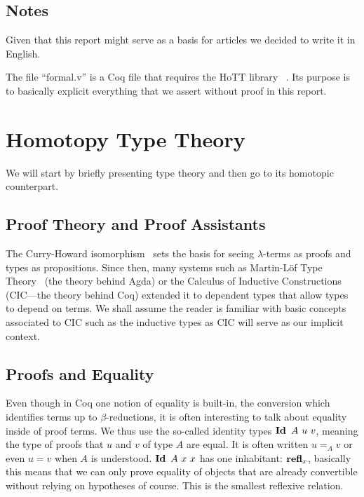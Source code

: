 \documentclass[11pt]{article}
\theoremstyle{plain}
\theoremstyle{remark}
\begin{document}
\subsection*{Notes}

Given that this report might serve as a basis for articles we decided to write
it in English.

The file ``formal.v'' is a Coq file that requires the HoTT library\ %
\cite{HoTTlib}.
Its purpose is to basically explicit everything that we assert without proof in
this report.

\newpage
\pagestyle{plain} %

\section{Homotopy Type Theory}

We will start by briefly presenting type theory and then go to its homotopic
counterpart.

\subsection{Proof Theory and Proof Assistants}

The Curry-Howard isomorphism~\cite{howard1995formulae} sets the basis for seeing
$\lambda$-terms as proofs and types as propositions. Since then, many systems
such as Martin-L\" of Type Theory~\cite{manin1975intuitionistic} (the theory
behind Agda) or the Calculus of Inductive Constructions (CIC---the theory
behind Coq) extended it to dependent
types that allow types to depend on terms.
We shall assume the reader is familiar with basic concepts associated to CIC
such as the inductive types as CIC will serve as our implicit context.

\subsection{Proofs and Equality}

Even though in Coq one notion of equality is built-in, the conversion which
identifies terms up to $\beta$-reductions, it is often interesting to talk
about equality inside of proof terms.
We thus use the so-called identity types $\Id\ A\ u\ v$, meaning the type of
proofs that $u$ and $v$ of type $A$ are equal. It is often written
$u =_A v$ or even $u = v$ when $A$ is understood.
$\operatorname{\mathbf{Id}}\ A\ x\ x$ has one inhabitant: $\operatorname{\mathbf{refl}}_x$,
basically this means that we can only prove equality of objects that are already
convertible without relying on hypotheses of course. This is the smallest
reflexive relation.
\end{document}
